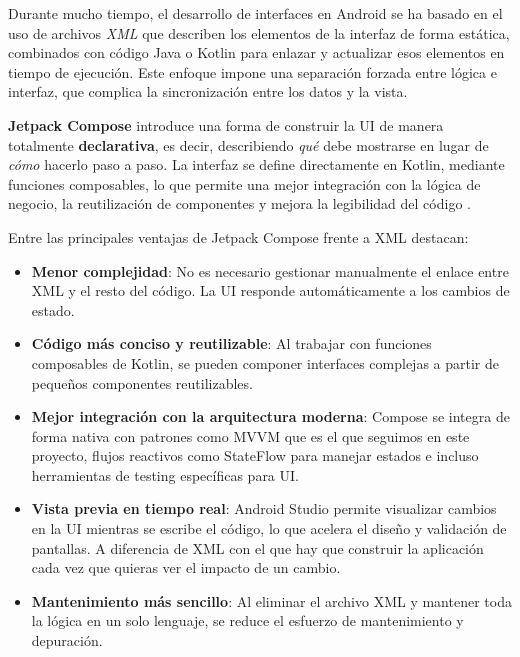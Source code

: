 Durante mucho tiempo, el desarrollo de interfaces en Android se ha basado en el uso de archivos \textit{XML} que describen los elementos de la interfaz de forma estática, combinados con código Java o Kotlin para enlazar y actualizar esos elementos en tiempo de ejecución. Este enfoque impone una separación forzada entre lógica e interfaz, que complica la sincronización entre los datos y la vista.

\textbf{Jetpack Compose} introduce una forma de construir la UI de manera totalmente \textbf{declarativa}, es decir, describiendo \textit{qué} debe mostrarse en lugar de \textit{cómo} hacerlo paso a paso. La interfaz se define directamente en Kotlin, mediante funciones composables, lo que permite una mejor integración con la lógica de negocio, la reutilización de componentes y mejora la legibilidad del código \cite{jetpack}.

Entre las principales ventajas de Jetpack Compose frente a XML destacan:

\begin{itemize}
    \item \textbf{Menor complejidad}: No es necesario gestionar manualmente el enlace entre XML y el resto del código. La UI responde automáticamente a los cambios de estado.

    \item \textbf{Código más conciso y reutilizable}: Al trabajar con funciones composables de Kotlin, se pueden componer interfaces complejas a partir de pequeños componentes reutilizables.

    \item \textbf{Mejor integración con la arquitectura moderna}: Compose se integra de forma nativa con patrones como MVVM que es el que seguimos en este proyecto, flujos reactivos como StateFlow para manejar estados e incluso herramientas de testing específicas para UI.

    \item \textbf{Vista previa en tiempo real}: Android Studio permite visualizar cambios en la UI mientras se escribe el código, lo que acelera el diseño y validación de pantallas. A diferencia de XML con el que hay que construir la aplicación cada vez que quieras ver el impacto de un cambio.

    \item \textbf{Mantenimiento más sencillo}: Al eliminar el archivo XML y mantener toda la lógica en un solo lenguaje, se reduce el esfuerzo de mantenimiento y depuración.
\end{itemize}

